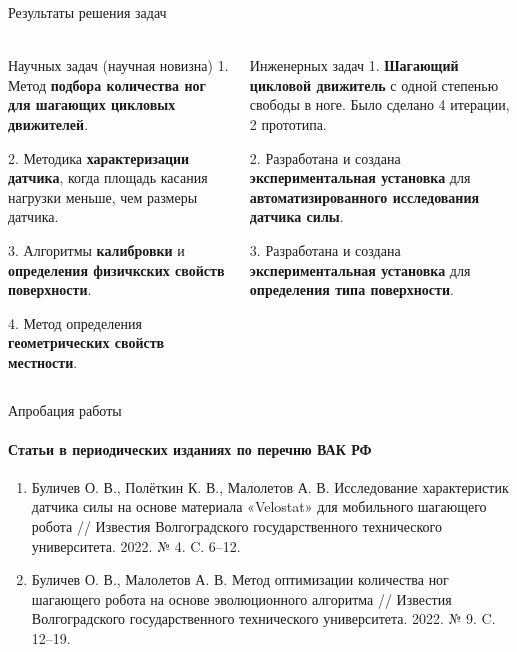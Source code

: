 \documentclass[aspectratio=169,xcolor=table]{beamer}
\begin{document}
\begin{frame}[t]{Результаты решения задач}
    \framesubtitle{}
    \vspace{-0.7cm}
        \begin{columns}[T,onlytextwidth]
            \begin{column}{0.48\textwidth}
                \begin{block}{Научных задач (научная новизна)}
                    1. Метод \textbf{подбора количества ног для шагающих цикловых движителей}.
                    
                    2. Методика \textbf{характеризации датчика}, когда площадь касания нагрузки меньше, чем размеры датчика.
                    
                    3. Алгоритмы \textbf{калибровки} и \textbf{определения физичкских свойств поверхности}.
                    
                    4. Метод определения \textbf{геометрических свойств местности}.   
                        
                    \end{block}
            \end{column}
            \begin{column}{0.48\textwidth}
                \begin{alertblock}{Инженерных задач}
     1. \textbf{Шагающий цикловой движитель} с одной степенью свободы в ноге. Было сделано 4 итерации, 2 прототипа.
    
    2. Разработана и создана \textbf{экспериментальная установка} для \textbf{автоматизированного исследования датчика силы}.
    
    3. Разработана и создана \textbf{экспериментальная установка} для \textbf{определения типа поверхности}.
    
                \end{alertblock}
            \end{column}
        \end{columns}
    \end{frame}

\begin{frame}[t]{Апробация работы}
\framesubtitle{Статьи в периодических изданиях по перечню ВАК РФ}
    \begin{enumerate}
        \item Буличев О. В., Полёткин К. В., Малолетов А. В. Исследование характеристик датчика силы на основе материала «Velostat» для мобильного шагающего робота // Известия Волгоградского государственного технического университета. 2022. № 4. C. 6–12.
        \item Буличев О. В., Малолетов А. В. Метод оптимизации количества ног шагающего робота на основе эволюционного алгоритма // Известия Волгоградского государственного технического университета. 2022. № 9. C. 12–19.
    \end{enumerate}
\end{frame}
\end{document}
